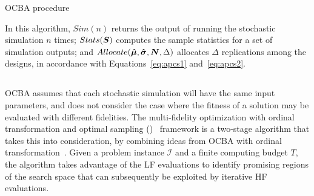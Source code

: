 \begin{algorithm}[h!] 
\caption{OCBA procedure}
\label{alg:ocba}
{\footnotesize
\begin{algorithmic}[1]
 
 
 
\label{while-loop}
   
   
   
   
   
\ENDWHILE
\end{algorithmic}
}
\end{algorithm}

In this algorithm, $Sim(n)$ returns the output of running the stochastic simulation $n$ times; $Stats(\boldsymbol{S})$ computes the sample statistics for a set of simulation outputs; and $Allocate(\boldsymbol{\hat{\mu}},\boldsymbol{\hat{\sigma}},\boldsymbol{N},\Delta)$ allocates $\Delta$ replications among the designs, in accordance with Equations~\ref{eq:apcs1} and~\ref{eq:apcs2}.

\subsection{\motos{}}
OCBA assumes that each stochastic simulation will have the same input parameters, and does not consider the case where the fitness of a solution may be evaluated with different fidelities. The multi-fidelity optimization with ordinal transformation and optimal sampling (\motos{})~\cite{xu2016mo2tos} framework is a two-stage algorithm that takes this into consideration, by combining ideas from OCBA with ordinal transformation~\cite{xu2014ordinal}. Given a problem instance $\mathcal{I}$ and a finite computing budget $T$, the \motos{} algorithm takes advantage of the LF evaluations to identify promising regions of the search space that can subsequently be exploited by iterative HF evaluations.

